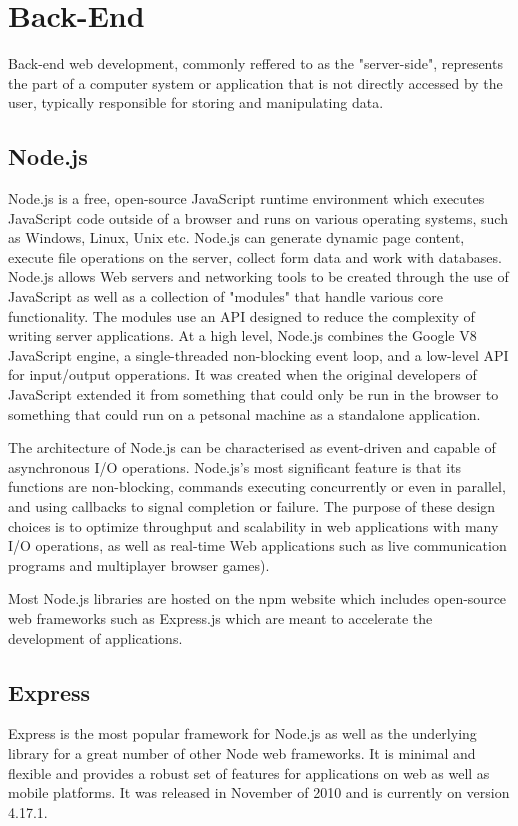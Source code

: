 \documentclass{report}
\begin{document}
\section {Back-End}
Back-end web development, commonly reffered to as the "server-side", represents the part of a computer system or application that is not directly accessed by the user, typically responsible for storing and manipulating data.

\subsection {Node.js}
Node.js is a free, open-source JavaScript runtime environment which executes JavaScript code outside of a browser and runs on various operating systems, such as Windows, Linux, Unix etc. Node.js can generate dynamic page content, execute file operations on the server, collect form data and work with databases. Node.js allows Web servers and networking tools to be created through the use of JavaScript as well as a collection of "modules" that handle various core functionality. The modules use an API designed to reduce the complexity of writing server applications. At a high level, Node.js combines the Google V8 JavaScript engine, a single-threaded non-blocking event loop, and a low-level API for input/output opperations. It was created when the original developers of JavaScript extended it from something that could only be run in the browser to something that could run on a petsonal machine as a standalone application.\par

The architecture of Node.js can be characterised as event-driven and capable of asynchronous I/O operations. Node.js's most significant feature is that its functions are non-blocking, commands executing concurrently or even in parallel, and using callbacks to signal completion or failure. The purpose of these design choices is to optimize throughput and scalability in web applications with many I/O operations, as well as real-time Web applications such as live communication programs and multiplayer browser games). \par

Most Node.js libraries are hosted on the npm website which includes open-source web frameworks such as Express.js which are meant to accelerate the development of applications. 

\subsection {Express}
Express is the most popular framework for Node.js as well as the underlying library for a great number of other Node web frameworks. It is minimal and flexible and provides a robust set of features for applications on web as well as mobile platforms. It was released in November of 2010 and is currently on version 4.17.1.\par
\end{document}
